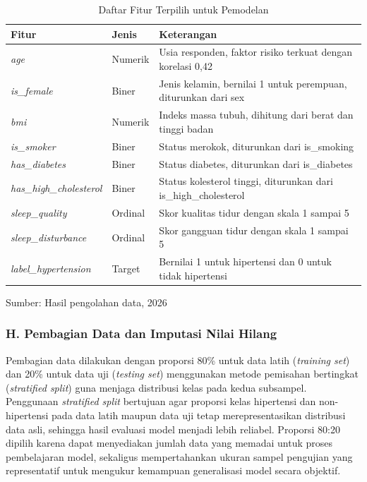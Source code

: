 \begin{table}[htbp]
    \centering
    \caption{Daftar Fitur Terpilih untuk Pemodelan}
    \label{tab:fitur_pemodelan}
    \renewcommand{\arraystretch}{1.2}
    \begin{tabular}{|l|l|p{8cm}|}
        \hline
        \textbf{Fitur} & \textbf{Jenis} & \textbf{Keterangan} \\ \hline
        \textit{age} & Numerik & Usia responden, faktor risiko terkuat dengan korelasi 0,42 \\ \hline
        \textit{is\_female} & Biner & Jenis kelamin, bernilai 1 untuk perempuan, diturunkan dari sex \\ \hline
        \textit{bmi} & Numerik & Indeks massa tubuh, dihitung dari berat dan tinggi badan \\ \hline
        \textit{is\_smoker} & Biner & Status merokok, diturunkan dari is\_smoking \\ \hline
        \textit{has\_diabetes} & Biner & Status diabetes, diturunkan dari is\_diabetes \\ \hline
        \textit{has\_high\_cholesterol} & Biner & Status kolesterol tinggi, diturunkan dari is\_high\_cholesterol \\ \hline
        \textit{sleep\_quality} & Ordinal & Skor kualitas tidur dengan skala 1 sampai 5 \\ \hline
        \textit{sleep\_disturbance} & Ordinal & Skor gangguan tidur dengan skala 1 sampai 5 \\ \hline
        \textit{label\_hypertension} & Target & Bernilai 1 untuk hipertensi dan 0 untuk tidak hipertensi \\ \hline
    \end{tabular}
    
    \vspace{0.2cm}
    \raggedright
    \small Sumber: Hasil pengolahan data, 2026
\end{table}

\subsubsection*{H. Pembagian Data dan Imputasi Nilai Hilang}
Pembagian data dilakukan dengan proporsi 80\% untuk data latih (\textit{training set}) dan 20\% untuk data uji (\textit{testing set}) menggunakan metode pemisahan bertingkat (\textit{stratified split}) guna menjaga distribusi kelas pada kedua subsampel. Penggunaan \textit{stratified split} bertujuan agar proporsi kelas hipertensi dan non-hipertensi pada data latih maupun data uji tetap merepresentasikan distribusi data asli, sehingga hasil evaluasi model menjadi lebih reliabel. Proporsi 80:20 dipilih karena dapat menyediakan jumlah data yang memadai untuk proses pembelajaran model, sekaligus mempertahankan ukuran sampel pengujian yang representatif untuk mengukur kemampuan generalisasi model secara objektif. 

